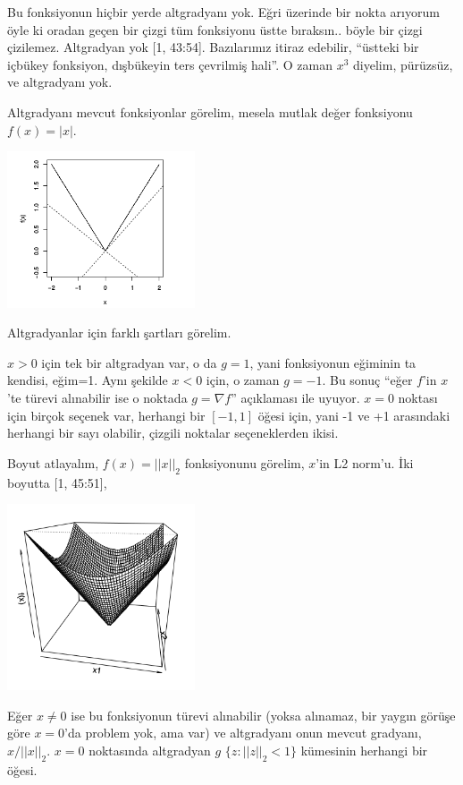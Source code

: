 \documentclass[12pt,fleqn]{article}\usepackage{../../common}
\begin{document}
Bu fonksiyonun hiçbir yerde altgradyanı yok. Eğri üzerinde bir nokta
arıyorum öyle ki oradan geçen bir çizgi tüm fonksiyonu üstte
bıraksın.. böyle bir çizgi çizilemez. Altgradyan yok [1,
43:54]. Bazılarımız itiraz edebilir, ``üstteki bir içbükey fonksiyon,
dışbükeyin ters çevrilmiş hali''. O zaman $x^3$ diyelim, pürüzsüz, ve
altgradyanı yok.

Altgradyanı mevcut fonksiyonlar görelim, mesela mutlak değer fonksiyonu
$f(x) = |x|$.

\includegraphics[width=15em]{func_42_subgrad_02.png}

Altgradyanlar için farklı şartları görelim.

$x>0$ için tek bir altgradyan var, o da $g = 1$, yani fonksiyonun eğiminin
ta kendisi, eğim=1. Aynı şekilde $x<0$ için, o zaman $g=-1$. Bu sonuç
``eğer $f$'in $x$'te türevi alınabilir ise o noktada $g=\nabla f$''
açıklaması ile uyuyor. $x=0$ noktası için birçok seçenek var, herhangi bir
$[-1,1]$ öğesi için, yani -1 ve +1 arasındaki herhangi bir sayı olabilir,
çizgili noktalar seçeneklerden ikisi.

Boyut atlayalım, $f(x) = ||x||_2$ fonksiyonunu görelim, $x$'in L2
norm'u. İki boyutta [1, 45:51],

\includegraphics[width=15em]{func_42_subgrad_03.png}

Eğer $x \ne 0$ ise bu fonksiyonun türevi alınabilir (yoksa alınamaz, bir
yaygın görüşe göre $x=0$'da problem yok, ama var) ve altgradyanı onun
mevcut gradyanı, $x / ||x||_2$. $x=0$ noktasında altgradyan $g$
$\{ z: ||z||_2 < 1\}$ kümesinin herhangi bir öğesi.
\end{document}
